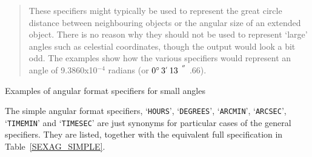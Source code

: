 \documentclass[twoside,11pt]{starlink}
\providecommand{\arcsec} {$\hspace{-0.05em}\raisebox{-0.5ex}
                     {$^{'\hspace{-0.1em}'}$}
                     \hspace{-0.7em}.\hspace{-0.05em}$}
\providecommand{\dms}[4] {$#1^{\circ}\,#2\raisebox{-0.5ex}{$^{'}$}\,#3\arcsec#4$}
\begin{document}
\begin{table}[htbp]
\begin{center}
\begin{quote}
These specifiers might typically be used to represent the great circle
distance between neighbouring objects or the angular size of an extended
object.  There is no reason why they should not be used to represent
`large' angles such as celestial coordinates, though the output would
look a bit odd.  The examples show how the various specifiers would
represent an angle of 9.3860x10$^{-4}$ radians (or \dms{0}{3}{13}{66}).
\end{quote}

\caption{\label{SMALL_EXAM}Examples of angular format specifiers for
small angles}
\end{center}

\end{table}

The simple angular format specifiers, `\texttt{HOURS}', `\texttt{DEGREES}',
`\texttt{ARCMIN}', `\texttt{ARCSEC}', `\texttt{TIMEMIN}' and `\texttt{TIMESEC}'
are just synonyms for particular cases of the
general specifiers. They are listed, together with the
equivalent full specification in Table~\ref{SEXAG_SIMPLE}.
\end{document}
